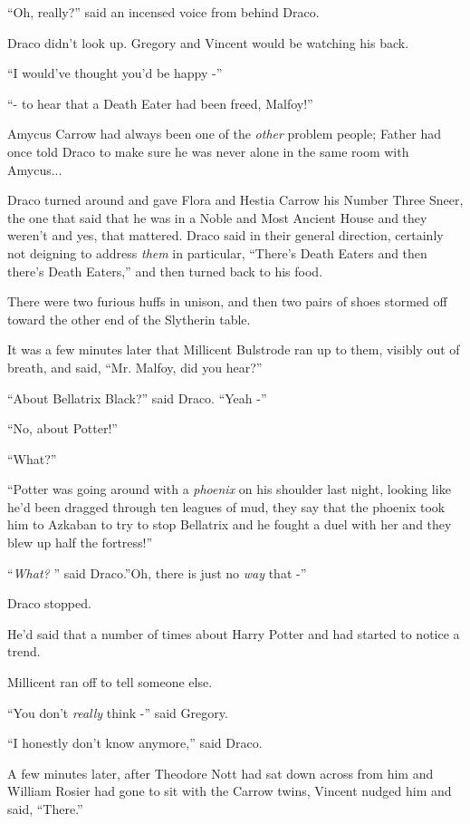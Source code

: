 ``Oh, really?'' said an incensed voice from behind Draco.

Draco didn't look up. Gregory and Vincent would be watching his back.

``I would've thought you'd be happy -''

``- to hear that a Death Eater had been freed, Malfoy!''

Amycus Carrow had always been one of the \emph{other} problem people;
Father had once told Draco to make sure he was never alone in the same
room with Amycus...

Draco turned around and gave Flora and Hestia Carrow his Number Three
Sneer, the one that said that he was in a Noble and Most Ancient House
and they weren't and yes, that mattered. Draco said in their general
direction, certainly not deigning to address \emph{them} in particular,
``There's Death Eaters and then there's Death Eaters,'' and then turned
back to his food.

There were two furious huffs in unison, and then two pairs of shoes
stormed off toward the other end of the Slytherin table.

It was a few minutes later that Millicent Bulstrode ran up to them,
visibly out of breath, and said, ``Mr. Malfoy, did you hear?''

``About Bellatrix Black?'' said Draco. ``Yeah -''

``No, about Potter!''

``What?''

``Potter was going around with a \emph{phoenix} on his shoulder last
night, looking like he'd been dragged through ten leagues of mud, they
say that the phoenix took him to Azkaban to try to stop Bellatrix and he
fought a duel with her and they blew up half the fortress!''

``\emph{What?} '' said Draco.''Oh, there is just no \emph{way} that -''

Draco stopped.

He'd said that a number of times about Harry Potter and had started to
notice a trend.

Millicent ran off to tell someone else.

``You don't \emph{really} think -'' said Gregory.

``I honestly don't know anymore,'' said Draco.

A few minutes later, after Theodore Nott had sat down across from him
and William Rosier had gone to sit with the Carrow twins, Vincent nudged
him and said, ``There.''

